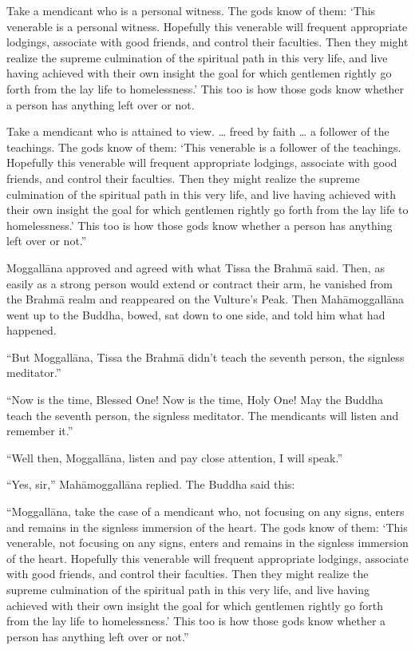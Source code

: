\documentclass[12pt,openany]{book}%
\begin{document}
Take a mendicant who is a personal witness. The gods know of them: ‘This venerable is a personal witness. Hopefully this venerable will frequent appropriate lodgings, associate with good friends, and control their faculties. Then they might realize the supreme culmination of the spiritual path in this very life, and live having achieved with their own insight the goal for which gentlemen rightly go forth from the lay life to homelessness.’ This too is how those gods know whether a person has anything left over or not. 

Take a mendicant who is attained to view. … freed by faith … a follower of the teachings. The gods know of them: ‘This venerable is a follower of the teachings. Hopefully this venerable will frequent appropriate lodgings, associate with good friends, and control their faculties. Then they might realize the supreme culmination of the spiritual path in this very life, and live having achieved with their own insight the goal for which gentlemen rightly go forth from the lay life to homelessness.’ This too is how those gods know whether a person has anything left over or not.” 

\textsanskrit{Moggallāna} approved and agreed with what Tissa the \textsanskrit{Brahmā} said. Then, as easily as a strong person would extend or contract their arm, he vanished from the \textsanskrit{Brahmā} realm and reappeared on the Vulture’s Peak. Then \textsanskrit{Mahāmoggallāna} went up to the Buddha, bowed, sat down to one side, and told him what had happened. 

“But \textsanskrit{Moggallāna}, Tissa the \textsanskrit{Brahmā} didn’t teach the seventh person, the signless meditator.” 

“Now is the time, Blessed One! Now is the time, Holy One! May the Buddha teach the seventh person, the signless meditator. The mendicants will listen and remember it.” 

“Well then, \textsanskrit{Moggallāna}, listen and pay close attention, I will speak.” 

“Yes, sir,” \textsanskrit{Mahāmoggallāna} replied. The Buddha said this: 

“\textsanskrit{Moggallāna}, take the case of a mendicant who, not focusing on any signs, enters and remains in the signless immersion of the heart. The gods know of them: ‘This venerable, not focusing on any signs, enters and remains in the signless immersion of the heart. Hopefully this venerable will frequent appropriate lodgings, associate with good friends, and control their faculties. Then they might realize the supreme culmination of the spiritual path in this very life, and live having achieved with their own insight the goal for which gentlemen rightly go forth from the lay life to homelessness.’ This too is how those gods know whether a person has anything left over or not.” 
\end{document}
